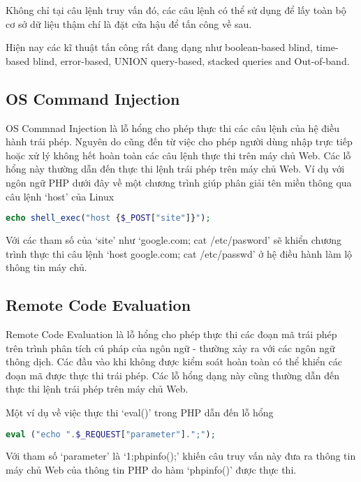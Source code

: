 \documentclass[./../main.tex]{subfiles}
\begin{document}
Không chỉ tại câu lệnh truy vấn đó, các câu lệnh có thể sử dụng để lấy toàn
bộ cơ sở dữ liệu thậm chí là đặt cửa hậu để tấn công về sau.

Hiện nay các kĩ thuật tấn công rất đang dạng như boolean-based blind,
time-based blind, error-based, UNION query-based, stacked queries and
Out-of-band.

\subsection{OS Command Injection}
OS Commnad Injection là lỗ hổng cho phép thực thi các câu lệnh
của hệ điều hành trái phép. Nguyên do cũng đến từ việc cho phép người dùng
nhập trực tiếp hoặc xử lý không hết hoàn toàn các câu lệnh thực thi trên
máy chủ Web. Các lỗ hổng này thường dẫn đến thực thi lệnh trái phép trên
máy chủ Web.
Ví dụ với ngôn ngữ PHP dưới đây về một chương trình giúp phân giải tên miền
thông qua câu lệnh `host' của Linux

\begin{lstlisting}[language=php, caption=Lỗ hổng OS Command Injection]
    echo shell_exec("host {$_POST["site"]}");
\end{lstlisting}

Với các tham số của `site' như `google.com; cat /etc/pasword' sẽ khiển chương trình thực thi câu lệnh `host google.com; cat /etc/passwd' ở hệ điều hành làm lộ thông tin máy chủ.

\subsection{Remote Code Evaluation}
Remote Code Evaluation là lỗ hổng cho phép thực thi các đoạn mã trái phép trên trình phân tích cú pháp của ngôn ngữ - thường xảy ra với các ngôn ngữ thông dịch. Các đầu vào khi không được kiểm soát hoàn toàn có thể khiển các đoạn mã được thực thi trái phép. Các lỗ hổng dạng này cũng thường dẫn đến thực thi lệnh trái phép trên máy chủ Web.

Một ví dụ về việc thực thi `eval()' trong PHP dẫn đến lỗ hổng

\begin{lstlisting}[language=php, caption=Lỗ hổng Remote Code Evaluation]
    eval ("echo ".$_REQUEST["parameter"].";");
\end{lstlisting}

Với tham số `parameter' là `1;phpinfo();' khiến câu truy vấn này đưa ra thông tin máy chủ Web của thông tin PHP do hàm `phpinfo()' được thực thi.
\end{document}
